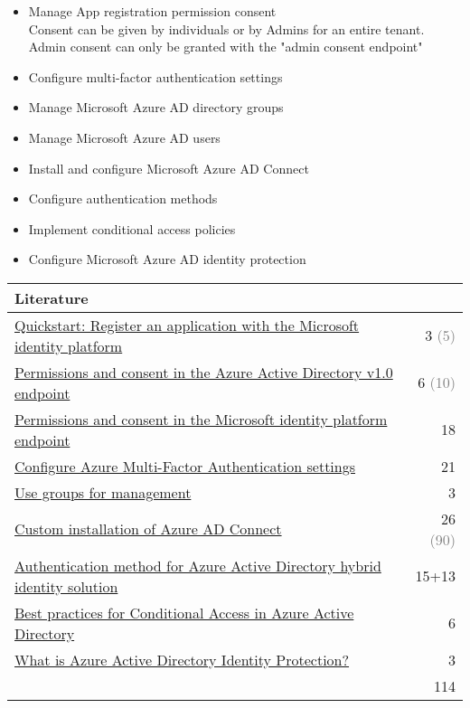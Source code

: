 \begin{itemize}
\begin{itemize}
	\end{itemize}
\item Manage App registration permission consent \\
Consent can be given by individuals or by Admins for an entire tenant. \\
Admin consent can only be granted with the "admin consent endpoint"
\item Configure multi-factor authentication settings 
\item Manage Microsoft Azure AD directory groups 
\item Manage Microsoft Azure AD users 
\item Install and configure Microsoft Azure AD Connect 
\item Configure authentication methods 
\item Implement conditional access policies 
\item Configure Microsoft Azure AD identity protection 
\end{itemize}

\begin{tabular}{p{14cm} | r}
\textbf{Literature} & \\
\hline
\href{https://docs.microsoft.com/en-us/azure/active-directory/develop/quickstart-register-app}{Quickstart: Register an application with the Microsoft identity platform} & 3 \textcolor{gray}{(5)} \\
\href{https://docs.microsoft.com/en-us/azure/active-directory/develop/v1-permissions-and-consent}{Permissions and consent in the Azure Active Directory v1.0 endpoint} & 6 \textcolor{gray}{(10)} \\
\href{https://docs.microsoft.com/en-us/azure/active-directory/develop/v2-permissions-and-consent}{Permissions and consent in the Microsoft identity platform endpoint} & 18 \\
\href{https://docs.microsoft.com/en-us/azure/active-directory/authentication/howto-mfa-mfasettings}{Configure Azure Multi-Factor Authentication settings} & 21 \\
\href{https://docs.microsoft.com/en-us/microsoft-365/enterprise/identity-use-group-management}{Use groups for management} & 3 \\
\href{https://docs.microsoft.com/en-us/azure/active-directory/hybrid/how-to-connect-install-custom}{Custom installation of Azure AD Connect} & 26 \textcolor{gray}{(90)} \\
\href{https://docs.microsoft.com/en-us/azure/security/fundamentals/choose-ad-authn}{Authentication method for Azure Active Directory hybrid identity solution} & 15+13 \\
\href{https://docs.microsoft.com/en-us/azure/active-directory/conditional-access/best-practices}{Best practices for Conditional Access in Azure Active Directory} & 6 \\
\href{https://docs.microsoft.com/en-us/azure/active-directory/identity-protection/overview-identity-protection}{What is Azure Active Directory Identity Protection?} & 3 \\
\cline{2-2} 
 & 114
\end{tabular}

